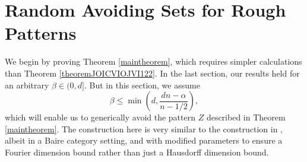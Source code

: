 \documentclass[12pt,reqno]{article}
\numberwithin{equation}{section}
\numberwithin{theorem}{section}
\begin{document}
\section{Random Avoiding Sets for Rough Patterns}

We begin by proving Theorem \ref{maintheorem}, which requires simpler calculations than Theorem \ref{theoremJOICVIOJVI122}. In the last section, our results held for an arbitrary $\beta \in (0,d]$. But in this section, we assume
%
\[ \beta \leq \min \left( d, \frac{dn - \alpha}{n - 1/2} \right), \]
%
which will enable us to generically avoid the pattern $Z$ described in Theorem \ref{maintheorem}. The construction here is very similar to the construction in \cite{OurPaper}, albeit in a Baire category setting, and with modified parameters to ensure a Fourier dimension bound rather than just a Hausdorff dimension bound.
\end{document}
